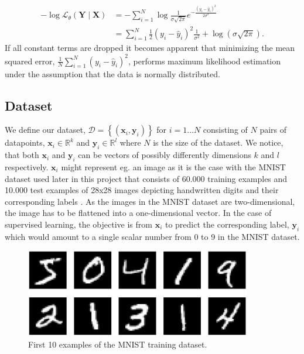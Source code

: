 \documentclass[a4paper,11pt]{article} %
\begin{document}
\begin{equation}
  \begin{split}
  -\log \mathcal{L}_{\theta}(\mathbf{Y} \mid \mathbf{X}) & = -\sum_{i=1}^{N} \log \frac{1}{\sigma \sqrt{2 \pi}} e^{-\frac{(y_i - \hat{y}_i)^{2}}{2 \sigma^{2}}} \\ 
  & = \sum_{i=1}^{N} \frac{1}{2}(y_i - \hat{y}_i)^2 \frac{1}{\sigma^2} + \log\left( \sigma \sqrt{2\pi} \right).
  \end{split}
\end{equation}
If all constant terms are dropped it becomes apparent that minimizing the mean squared error, $\frac{1}{N}\sum_{i=1}^{N} (y_i - \hat{y}_i)^2$, performs maximum likelihood estimation under the assumption that the data is normally distributed.

\subsection{Dataset}
We define our dataset, $\mathcal{D} = \left\{(\mathbf{x}_i, \mathbf{y}_i)\right\}$ for $i = 1 \ldots N$ consisting of $N$ pairs of datapoints, $\mathbf{x}_i \in \mathbb{R}^k$ and $\mathbf{y}_i \in \mathbb{R}^l$ where $N$ is the size of the dataset. We notice, that both $\mathbf{x}_i$ and $\mathbf{y}_i$ can be vectors of possibly differently dimensions $k$ and $l$ respectively. $\mathbf{x}_i$ might represent eg. an image as it is the case with the MNIST dataset used later in this project that consists of 60.000 training examples and 10.000 test examples of 28x28 images depicting handwritten digits and their corresponding labels \cite{mnist}. As the images in the MNIST dataset are two-dimensional, the image has to be flattened into a one-dimensional vector. In the case of supervised learning, the objective is from $\mathbf{x}_i$ to predict the corresponding label, $\mathbf{y}_i$ which would amount to a single scalar number from 0 to 9 in the MNIST dataset. 
\begin{figure}[ht]
  \centering
  \includegraphics[width=280pt]{graphics/mnist.png}  
  \caption{First 10 examples of the MNIST training dataset.}
  \label{fig:MNIST}
\end{figure}
\end{document}
